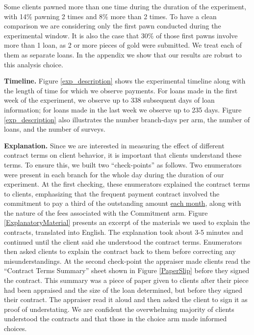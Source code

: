 \documentclass[ecta,nameyear,final]{econsocart}
\begin{document}
Some clients pawned more than one time during the duration of the experiment, with 14\% pawning 2 times and 8\% more than 2 times. To have a clean comparison we are considering only the first pawn conducted during the experimental window. It is also the case that 30\% of those first pawns involve more than 1 loan, as 2 or more pieces of gold were submitted. We treat each of them as separate loans. In the appendix we show that our results are robust to this analysis choice. 


\noindent \textbf{Timeline.} Figure \ref{exp_description} shows the experimental timeline along with the length of time for which we observe payments. For loans made in the first week of the experiment, we observe up to 338 subsequent days of loan information; for loans made in the last week we observe up to 235 days. Figure \ref{exp_description} also illustrates the number branch-days per arm, the number of loans, and the number of surveys. %

\noindent \textbf{Explanation.} Since we are interested in measuring the effect of different contract terms on client behavior, it is important that clients understand these terms. To ensure this, we built two ``check-points'' as follows.  Two enumerators were present in each branch for the whole day during the duration of our experiment. At the first checking, these enumerators explained the contract terms to clients, emphasizing that the frequent payment contract involved the commitment to pay a third of the outstanding amount \underline{each month}, along with the nature of the fees associated with the Commitment arm. Figure \ref{ExplanatoryMaterial} presents an excerpt of the materials we used to explain the contracts, translated into English. The explanation took about 3-5 minutes and continued until the client said she understood the contract terms. Enumerators then asked clients to explain the contract back to them before correcting any misunderstandings. At the second check-point the appraiser made clients read the ``Contract Terms Summary'' sheet shown in Figure \ref{PaperSlip} before they signed the contract. This summary was a piece of paper given to clients after their piece had been appraised and the size of the loan determined, but before they signed their contract. The appraiser read it aloud and then asked the client to sign it as proof of understating. %
We are confident the overwhelming majority of clients understood the contracts and that those in the choice arm made informed choices.
\end{document}
